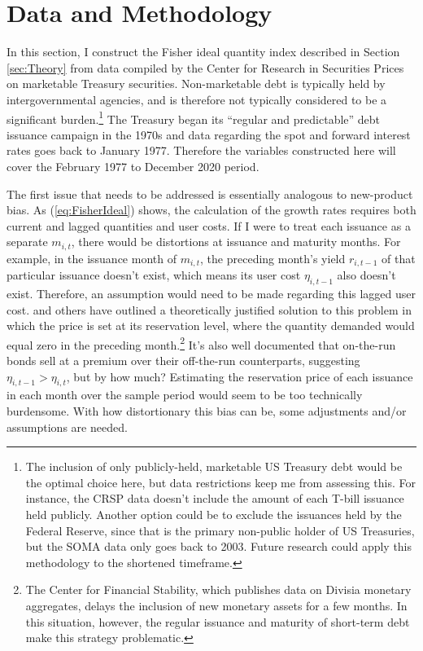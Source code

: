 \documentclass[11pt,a4paper,margin=1.5in]{article}
\begin{document}
\section{Data and Methodology}
\label{sec:DataMethodology}
In this section, I construct the Fisher ideal quantity index described in Section \ref{sec:Theory} from data compiled by the Center for Research in Securities Prices on marketable Treasury securities.
Non-marketable debt is typically held by intergovernmental agencies, and is therefore not typically considered to be a significant burden.\footnote{
	The inclusion of only publicly-held, marketable US Treasury debt would be the optimal choice here, but data restrictions keep me from assessing this.
	For instance, the CRSP data doesn't include the amount of each T-bill issuance held publicly.
	Another option could be to exclude the issuances held by the Federal Reserve, since that is the primary non-public holder of US Treasuries, but the SOMA data only goes back to 2003.
	Future research could apply this methodology to the shortened timeframe.}
The Treasury began its ``regular and predictable'' debt issuance campaign in the 1970s and data regarding the spot and forward interest rates goes back to January 1977.
Therefore the variables constructed here will cover the February 1977 to December 2020 period.

The first issue that needs to be addressed is essentially analogous to new-product bias.
As (\ref{eq:FisherIdeal}) shows, the calculation of the growth rates requires both current and lagged quantities and user costs. 
If I were to treat each issuance as a separate $m_{i,t}$, there would be distortions at issuance and maturity months.
For example, in the issuance month of $m_{i,t}$, the preceding month's yield $r_{i,t-1}$ of that particular issuance doesn't exist, which means its user cost $\eta_{i,t-1}$ also doesn't exist.
Therefore, an assumption would need to be made regarding this lagged user cost.
\citet{Feenstra:1994} and others have outlined a theoretically justified solution to this problem in which the price is set at its reservation level, where the quantity demanded would equal zero in the preceding month.\footnote{
	The Center for Financial Stability, which publishes data on Divisia monetary aggregates, delays the inclusion of new monetary assets for a few months.
	In this situation, however, the regular issuance and maturity of short-term debt make this strategy problematic.}
It's also well documented that on-the-run bonds sell at a premium over their off-the-run counterparts, suggesting $\eta_{i,t-1} > \eta_{i,t}$, but by how much?
Estimating the reservation price of each issuance in each month over the sample period would seem to be too technically burdensome. 
With how distortionary this bias can be, some adjustments and/or assumptions are needed.
\end{document}
